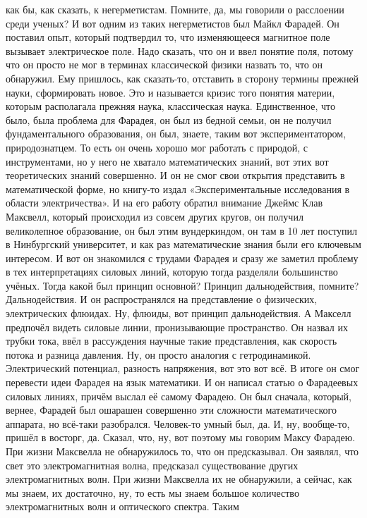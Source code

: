как бы, как сказать, к негерметистам. Помните, да, мы говорили о расслоении
среди ученых? И вот одним из таких негерметистов был Майкл Фарадей. Он поставил
опыт, который подтвердил то, что изменяющееся магнитное поле вызывает
электрическое поле. Надо сказать, что он и ввел понятие поля, потому что он
просто не мог в терминах классической физики назвать то, что он обнаружил. Ему
пришлось, как сказать-то, отставить в сторону термины прежней науки,
сформировать новое. Это и называется кризис того понятия материи, которым
располагала прежняя наука, классическая наука. Единственное, что было, была
проблема для Фарадея, он был из бедной семьи, он не получил фундаментального
образования, он был, знаете, таким вот экспериментатором, природознатцем. То
есть он очень хорошо мог работать с природой, с инструментами, но у него не
хватало математических знаний, вот этих вот теоретических знаний совершенно. И
он не смог свои открытия представить в математической форме, но книгу-то издал
«Экспериментальные исследования в области электричества». И на его работу
обратил внимание Джеймс Клав Максвелл, который происходил из совсем других
кругов, он получил великолепное образование, он был этим вундеркиндом, он там в
10 лет поступил в Нинбургский университет, и как раз математические знания были
его ключевым интересом. И вот он знакомился с трудами Фарадея и сразу же заметил
проблему в тех интерпретациях силовых линий, которую тогда разделяли большинство
учёных. Тогда какой был принцип основной? Принцип дальнодействия, помните?
Дальнодействия. И он распространялся на представление о физических,
электрических флюидах. Ну, флюиды, вот принцип дальнодействия. А Макселл
предпочёл видеть силовые линии, пронизывающие пространство. Он назвал их трубки
тока, ввёл в рассуждения научные такие представления, как скорость потока и
разница давления. Ну, он просто аналогия с гетродинамикой. Электрический
потенциал, разность напряжения, вот это вот всё. В итоге он смог перевести идеи
Фарадея на язык математики. И он написал статью о Фарадеевых силовых линиях,
причём выслал её самому Фарадею. Он был сначала, который, вернее, Фарадей был
ошарашен совершенно эти сложности математического аппарата, но всё-таки
разобрался. Человек-то умный был, да. И, ну, вообще-то, пришёл в восторг, да.
Сказал, что, ну, вот поэтому мы говорим Максу Фарадею. При жизни Максвелла не
обнаружилось то, что он предсказывал. Он заявлял, что свет это электромагнитная
волна, предсказал существование других электромагнитных волн. При жизни
Максвелла их не обнаружили, а сейчас, как мы знаем, их достаточно, ну, то есть
мы знаем большое количество электромагнитных волн и оптического спектра. Таким
